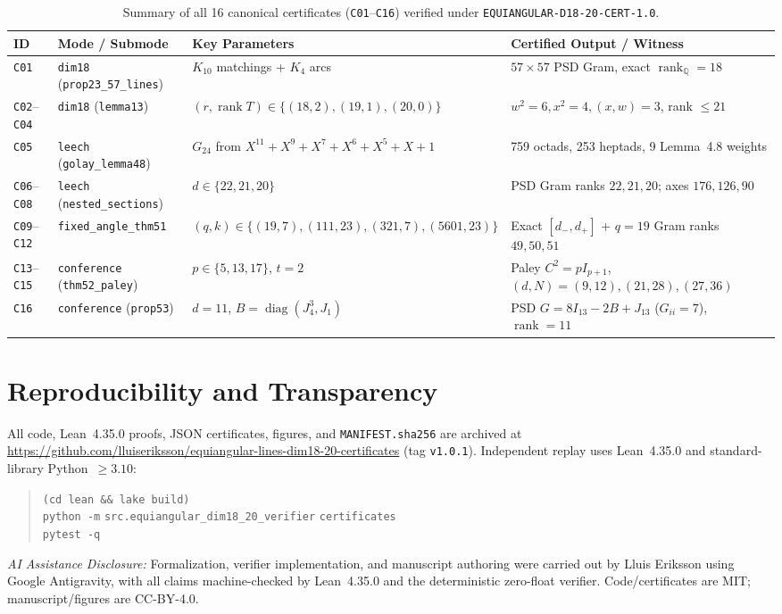 \documentclass[10pt,twocolumn]{article}
\begin{document}
\begin{table}[tb]
\centering
\caption{Summary of all 16 canonical certificates (\texttt{C01}--\texttt{C16}) verified under \texttt{EQUIANGULAR-D18-20-CERT-1.0}.}
\label{tab:certs}
\scriptsize
\setlength{\tabcolsep}{3pt}
\begin{tabular}{@{}llll@{}}
\toprule
ID & Mode / Submode & Key Parameters & Certified Output / Witness \\
\midrule
\texttt{C01} & \texttt{dim18} (\texttt{prop23\_57\_lines}) & $K_{10}$ matchings + $K_4$ arcs & $57\times 57$ PSD Gram, exact $\operatorname{rank}_{\mathbb{Q}} = 18$ \\
\texttt{C02}--\texttt{C04} & \texttt{dim18} (\texttt{lemma13}) & $(r,\operatorname{rank} T)\in\{(18,2),(19,1),(20,0)\}$ & $w^2=6, x^2=4, (x,w)=3$, rank $\leq 21$ \\
\texttt{C05} & \texttt{leech} (\texttt{golay\_lemma48}) & $G_{24}$ from $X^{11}+X^9+X^7+X^6+X^5+X+1$ & 759 octads, 253 heptads, 9 Lemma~4.8 weights \\
\texttt{C06}--\texttt{C08} & \texttt{leech} (\texttt{nested\_sections}) & $d \in \{22, 21, 20\}$ & PSD Gram ranks $22, 21, 20$; axes $176, 126, 90$ \\
\texttt{C09}--\texttt{C12} & \texttt{fixed\_angle\_thm51} & $(q,k)\in\{(19,7),(111,23),(321,7),(5601,23)\}$ & Exact $[d_-,d_+]$ + $q=19$ Gram ranks $49,50,51$ \\
\texttt{C13}--\texttt{C15} & \texttt{conference} (\texttt{thm52\_paley}) & $p \in \{5, 13, 17\}$, $t = 2$ & Paley $C^2=p I_{p+1}$, $(d,N)=(9,12),(21,28),(27,36)$ \\
\texttt{C16} & \texttt{conference} (\texttt{prop53}) & $d = 11$, $B=\operatorname{diag}(J_4^3,J_1)$ & PSD $G=8I_{13}-2B+J_{13}$ ($G_{ii}=7$), $\operatorname{rank}=11$ \\
\bottomrule
\end{tabular}
\end{table}

\FloatBarrier
\section{Reproducibility and Transparency}
All code, Lean~4.35.0 proofs, JSON certificates, figures, and \texttt{MANIFEST.sha256} are archived at \url{https://github.com/lluiseriksson/equiangular-lines-dim18-20-certificates} (tag \texttt{v1.0.1}). Independent replay uses Lean~4.35.0 and standard-library Python~$\geq 3.10$:
\begin{quote}\small\raggedright
\texttt{(cd lean \&\& lake build)}\\
\texttt{python -m} \nolinkurl{src.equiangular_dim18_20_verifier} \texttt{certificates}\\
\texttt{pytest -q}
\end{quote}
\noindent\textit{AI Assistance Disclosure:} Formalization, verifier implementation, and manuscript authoring were carried out by Lluis Eriksson using Google Antigravity, with all claims machine-checked by Lean~4.35.0 and the deterministic zero-float verifier. Code/certificates are MIT; manuscript/figures are CC-BY-4.0.
\end{document}
